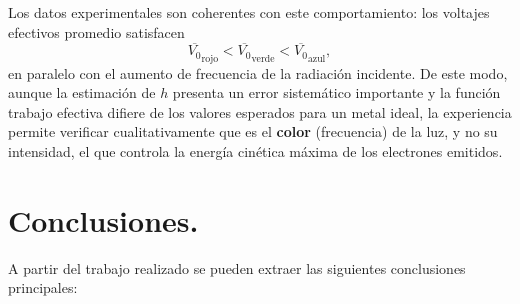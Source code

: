 \documentclass[11pt,twocolumn]{article}
\begin{document}
Los datos experimentales son coherentes con este comportamiento: los
voltajes efectivos promedio satisfacen
\begin{equation*}
    \overline{V_0}_{\text{rojo}} < \overline{V_0}_{\text{verde}} <
    \overline{V_0}_{\text{azul}},
\end{equation*}
en paralelo con el aumento de frecuencia de la radiación incidente. De
este modo, aunque la estimación de $h$ presenta un error sistemático
importante y la función trabajo efectiva difiere de los valores
esperados para un metal ideal, la experiencia permite verificar
cualitativamente que es el \textbf{color} (frecuencia) de la luz, y no
su intensidad, el que controla la energía cinética máxima de los
electrones emitidos.

\section{Conclusiones.}

A partir del trabajo realizado se pueden extraer las siguientes
conclusiones principales:
\end{document}
